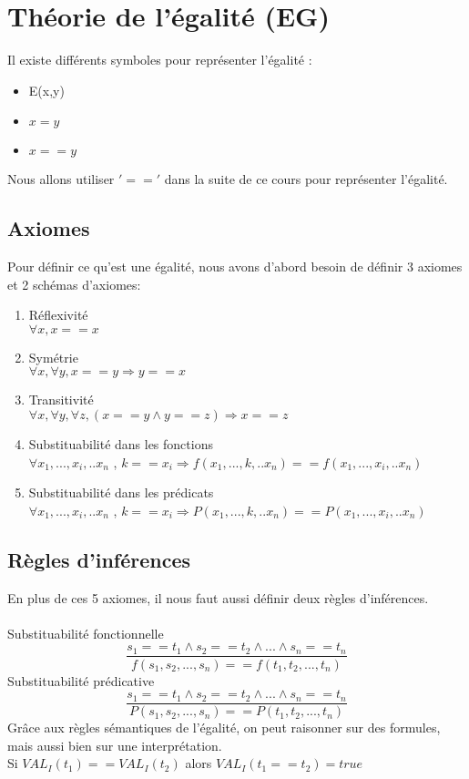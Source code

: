 \section{Théorie de l'égalité (EG)}
Il existe différents symboles pour représenter l'égalité : 
\begin{itemize}
	\item E(x,y)
	\item $x = y$
	\item $x == y $
\end{itemize}
Nous allons utiliser $'=='$ dans la suite de ce cours pour représenter l'égalité.

\subsection{Axiomes} 
Pour définir ce qu'est une égalité, nous avons d'abord besoin de définir 3 axiomes et 2 schémas d'axiomes:
\begin{enumerate}
\item Réflexivité \\$\forall x, x==x$
\item Symétrie \\$\forall x, \forall y, x==y \Rightarrow y==x$
\item Transitivité \\$\forall x, \forall y, \forall z, (x==y \land y==z) \Rightarrow x==z$
\item Substituabilité dans les fonctions\\$\forall x_{1}, ...,x_i, .. x_{n}$ ,  $k==x_i \Rightarrow f(x_{1}, ...,k, .. x_{n}) == f(x_{1}, ...,x_i, .. x_{n})$
\item Substituabilité dans les prédicats\\$\forall x_{1}, ...,x_i, .. x_{n}$ ,  $k==x_i \Rightarrow P(x_{1}, ...,k, .. x_{n}) == P(x_{1}, ...,x_i, .. x_{n})$ 
\end{enumerate}
\subsection{Règles d'inférences}
En plus de ces 5 axiomes, il nous faut aussi définir deux règles d'inférences.\\ \\
Substituabilité fonctionnelle 
	$$ \frac{s_{1}==t_{1} \land s_{2}==t_{2} \land ... \land s_{n}==t_{n}}{f(s_{1},s_{2},...,s_{n}) == f(t_{1},t_{2},...,t_{n})}$$ 
	Substituabilité prédicative 
	$$ \frac{s_{1}==t_{1} \land s_{2}==t_{2} \land ... \land s_{n}==t_{n}}{P(s_{1},s_{2},...,s_{n}) == P(t_{1},t_{2},...,t_{n})}$$ 
Grâce aux règles sémantiques de l'égalité, on peut raisonner sur des formules, mais aussi bien sur une interprétation. \\ 
Si $VAL_{I}(t_{1}) ==  VAL_{I}(t_{2})$ alors $VAL_{I}(t_{1} == t_{2}) = true$

